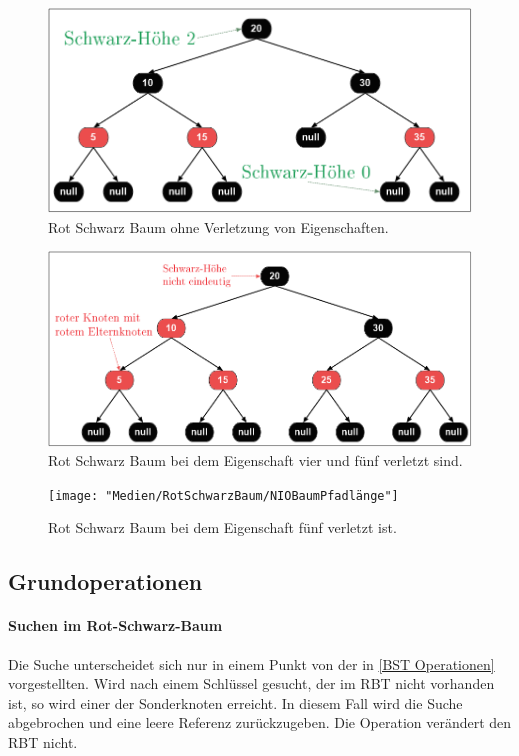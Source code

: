\documentclass[a4paper,12pt]{article}
\begin{document}
\begin{figure}[h]
	\centering
	\includegraphics[width= 1\textwidth]{"Medien/RotSchwarzBaum/IOBaum"}
	\caption{Rot Schwarz Baum ohne Verletzung von Eigenschaften. }
	\label{fig:IOBaum}
\end{figure}
\begin{figure}[h]
	\centering
	\includegraphics[width= 1\textwidth]{"Medien/RotSchwarzBaum/NIOBaumZweiRote"}
	\caption{Rot Schwarz Baum bei dem Eigenschaft vier und fünf verletzt sind. }
	\label{fig:NIOBaumZweiRote}
\end{figure}
\begin{figure}[h]
	\centering
	\texttt{[image: "Medien/RotSchwarzBaum/NIOBaumPfadlänge"]}
	\caption{Rot Schwarz Baum bei dem Eigenschaft fünf verletzt ist.  }
	\label{fig:NIOBaumPfadlänge}
\end{figure}
\subsection{Grundoperationen}
\paragraph{Suchen im Rot-Schwarz-Baum}
Die Suche unterscheidet sich nur in einem Punkt von der in \ref{BST Operationen} vorgestellten. Wird nach einem Schlüssel gesucht, der im RBT nicht vorhanden ist, so wird einer der Sonderknoten erreicht. In diesem Fall wird die Suche abgebrochen und eine leere Referenz zurückzugeben. Die Operation verändert den RBT nicht. 
\end{document}
